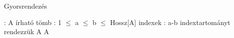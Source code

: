 \documentclass{article}
\begin{document}
\begin{psz}\caption{Gyorsrendezés}
\begin{algorithmic}
\Require: A írható tömb
\Require: 1 $\leq$ a $\leq$ b $\leq$ Hossz[A] indexek
\Ensure: a-b indextartományt rendezzük
\State \Return A
\Else
\State {}
\State {}
\State {}
\State \Return A
\EndIf
\EndProcedure
\end{algorithmic}
\end{psz}
\end{document}
